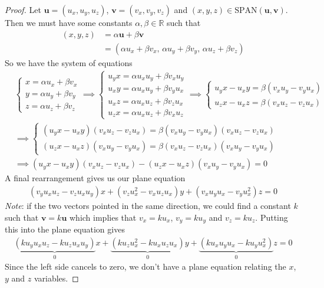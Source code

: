 \begin{proof}
Let $\mathbf{u}=(u_x,u_y,u_z)$, $\mathbf{v}=(v_x,v_y,v_z)$ and $(x,y,z)\in \text{SPAN}(\mathbf{u},\mathbf{v})$. Then we must have some constants $\alpha,\beta \in \mathbb{R}$ such that
\begin{align*}
(x,y,z) &= \alpha \mathbf{u} + \beta \mathbf{v} \\
&= (\alpha u_x + \beta v_x, \, \alpha u_y + \beta v_y, \, \alpha u_z + \beta v_z)
\end{align*}
So we have the system of equations
\begin{align*}
& \begin{cases}
x = \alpha u_x + \beta v_x \\
y = \alpha u_y + \beta v_y \\
z = \alpha u_z + \beta v_z
\end{cases}
\implies
\begin{cases}
u_y x = \alpha u_x u_y  + \beta v_x u_y  \\
u_x y = \alpha u_x u_y + \beta v_y u_x \\
u_x z = \alpha u_x u_z + \beta v_z u_x \\
u_z x = \alpha u_x u_z + \beta v_x u_z 
\end{cases}
\implies
\begin{cases}
u_y x - u_x y = \beta (v_x u_y - v_y u_x) \\
u_z x - u_x z = \beta (v_x u_z -  v_z u_x)
\end{cases} \\
& \implies
\begin{cases}
(u_y x - u_x y)(v_x u_z -  v_z u_x) = \beta (v_x u_y - v_y u_x)(v_x u_z -  v_z u_x) \\
(u_z x - u_x z)(v_x u_y - v_y u_x) = \beta (v_x u_z -  v_z u_x)(v_x u_y - v_y u_x)
\end{cases} \\
& \implies
(u_y x - u_x y)(v_x u_z -  v_z u_x) - (u_z x - u_x z)(v_x u_y - v_y u_x) = 0
\end{align*}
A final rearrangement gives us our plane equation
\begin{align*}
(v_y u_x u_z-  v_z u_x u_y)x + (v_z u_x^2 - v_x u_z u_x) y + (v_x u_y u_x - v_y u_x^2)z = 0
\end{align*}
\textit{Note}: if the two vectors pointed in the same direction, we could find a constant $k$ such that $\mathbf{v}=k\mathbf{u}$ which implies that $v_x=ku_x$, $v_y=ku_y$ and $v_z=ku_z$. Putting this into the plane equation gives
\begin{align*}
\underbrace{(ku_y u_x u_z-  ku_z u_x u_y)}_0x + \underbrace{(ku_z u_x^2 - ku_x u_z u_x)}_0 y + \underbrace{(ku_x u_y u_x - ku_y u_x^2)}_0z = 0
\end{align*}
Since the left side cancels to zero, we don't have a plane equation relating the $x$, $y$ and $z$ variables.
\end{proof}


